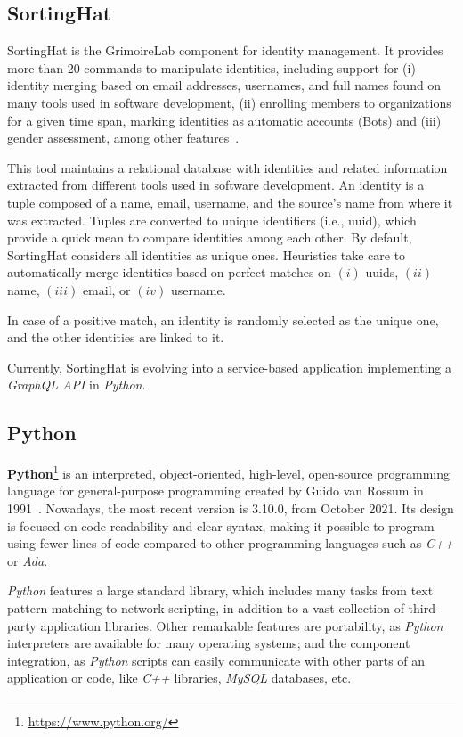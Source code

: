 \documentclass[a4paper, 12pt]{book}
\begin{document}
\subsection{SortingHat}
\label{sec:SortingHat}

SortingHat is the GrimoireLab component for identity management. It provides more than 20 commands to manipulate identities, including support for (i) identity merging based on email addresses, usernames, and full names found on many tools used in software development, (ii) enrolling members to organizations for a given time span, marking identities as automatic accounts (Bots) and (iii) gender assessment, among other features~\cite{moreno_et_al:sortinghat}.

This tool maintains a relational database with identities and related information extracted from different tools used in software development. An identity is a tuple composed of a name, email, username, and the source's name from where it was extracted. Tuples are converted to unique identifiers (i.e., uuid), which provide a quick mean to compare identities among each other. By default, SortingHat considers all identities as unique ones. Heuristics take care to automatically merge identities based on perfect matches on \((i)\) uuids, \((ii)\) name, \((iii)\) email, or \((iv)\) username.

In case of a positive match, an identity is randomly selected as the unique one, and the other identities are linked to it.

Currently, SortingHat is evolving into a service-based application implementing a \emph{GraphQL API} in \emph{Python}.

\subsection{Python}
\label{ssec:python}

\textbf{Python}\footnote{\url{https://www.python.org/}} is an interpreted, object-oriented, high-level, open-source
programming language for general-purpose programming created by Guido van Rossum in 1991~\cite{van2007python}. Nowadays, the most
recent version is 3.10.0, from October 2021. Its design is focused on code readability and clear syntax, making
it possible to program using fewer lines of code compared to other programming languages such as \emph{C++} or \emph{Ada}.

\emph{Python} features a large standard library, which includes many tasks from text pattern matching to network
scripting, in addition to a vast collection of third-party application libraries.
Other remarkable features are portability, as \emph{Python} interpreters are available for many operating systems;
and the component integration, as \emph{Python} scripts can easily communicate with other parts of an application or code,
like \emph{C++} libraries, \emph{MySQL} databases, etc.
\end{document}
